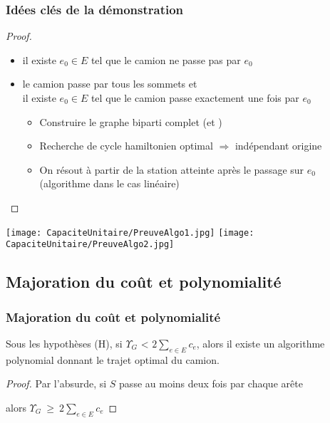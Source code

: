 \begin{frame}
\frametitle{Idées clés de la démonstration}

\begin{proof}
  \begin{itemize}
  \item<1-> il existe $e_0 \in E$ tel que le camion ne passe pas par $e_0$
  \item<2-> le camion passe par tous les sommets et\\
    il existe $e_0 \in E$ tel que le camion passe exactement une fois par $e_0$
    \begin{itemize}
    \item<3-> Construire le graphe biparti complet (\plus et \moins)
    \item<4-> Recherche de cycle hamiltonien optimal $\Rightarrow$ indépendant origine
    \item<5-> On résout à partir de la station atteinte après le passage sur $e_0$\\
    (algorithme dans le cas linéaire)
    \end{itemize}
  \end{itemize}
  \baselineskip
\end{proof}
{
  \begin{center}
    \texttt{[image: CapaciteUnitaire/PreuveAlgo1.jpg]}
    \hspace{2cm}
    \texttt{[image: CapaciteUnitaire/PreuveAlgo2.jpg]}
  \end{center}
}

\end{frame}


\subsection{Majoration du coût et polynomialité}

\begin{frame}
\frametitle{Majoration du coût et polynomialité}
{
  \begin{prop}
  Sous les hypothèses (H), si  $\Upsilon_G$ < $2\sum_{e \in E}c_e$, alors il existe un algorithme polynomial donnant le trajet optimal du camion.
  \end{prop}
}
{
  \begin{proof}
  Par l'absurde, si $S$ passe au moins deux fois par chaque arête
  
  alors $\Upsilon_G~\ge~2\sum_{e \in E}c_e$
    \baselineskip
  \end{proof}
}

\end{frame}